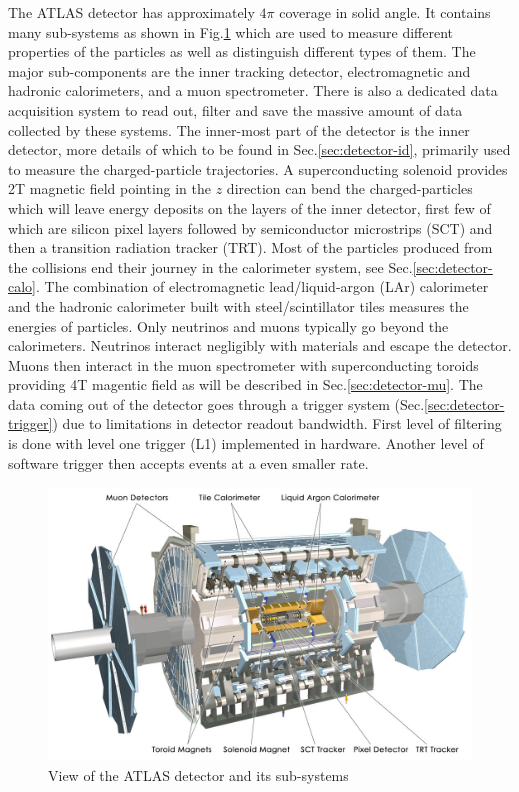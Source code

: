 The ATLAS detector has approximately $4\pi$ coverage in solid angle. It contains many sub-systems as shown in Fig.\ref{fig:detector-atlas} which are used to measure different properties of the particles as well as distinguish different types of them. The major sub-components are the inner tracking detector, electromagnetic and hadronic calorimeters, and a muon spectrometer. There is also a dedicated data acquisition system to read out, filter and save the massive amount of data collected by these systems. The inner-most part of the detector is the inner detector, more details of which to be found in Sec.\ref{sec:detector-id}, primarily used to measure the charged-particle trajectories. A superconducting solenoid provides 2T magnetic field pointing in the $z$ direction can bend the charged-particles which will leave energy deposits on the layers of the inner detector, first few of which are silicon pixel layers followed by semiconductor microstrips (SCT) and then a transition radiation tracker (TRT). Most of the particles produced from the collisions end their journey in the calorimeter system, see Sec.\ref{sec:detector-calo}. The combination of electromagnetic lead/liquid-argon (LAr) calorimeter and the hadronic calorimeter built with steel/scintillator tiles measures the energies of particles. Only neutrinos and muons typically go beyond the calorimeters. Neutrinos interact negligibly with materials and escape the detector. Muons then interact in the muon spectrometer with superconducting toroids providing 4T magentic field as will be described in Sec.\ref{sec:detector-mu}. The data coming out of the detector goes through a trigger system (Sec.\ref{sec:detector-trigger}) due to limitations in detector readout bandwidth. First level of filtering is done with level one trigger (L1) implemented in hardware. Another level of software trigger then accepts events at a even smaller rate. 


\begin{figure}[htpb!]
\begin{center}
  \includegraphics[width=0.85\linewidth]{figures/detector/ATLAS_Silver_White_MK}
\caption{View of the ATLAS detector and its sub-systems}
\label{fig:detector-atlas}
\end{center}
\end{figure}


